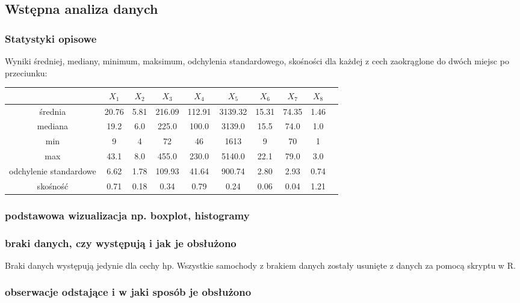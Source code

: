 \documentclass{article}
\begin{document}
    \subsection{Wstępna analiza danych}
        \subsubsection*{Statystyki opisowe}
        Wyniki średniej, mediany, minimum, maksimum, odchylenia standardowego, skośności dla każdej z cech zaokrąglone do dwóch 
        miejsc po przeciunku:
        \begin{center}
            \begin{tabular}{ |c|c|c|c|c|c|c|c|c|c| } 
                \hline
                & ${X_1}$ & ${X_2}$ & ${X_3}$ & ${X_4}$ & ${X_5}$ & ${X_6}$ & ${X_7}$ & ${X_8}$ \\
                \hline
                średnia & 20.76  & 5.81 & 216.09 & 112.91 & 3139.32 & 15.31 & 74.35 & 1.46 \\
                \hline
                mediana & 19.2 & 6.0 & 225.0 & 100.0 & 3139.0 & 15.5 & 74.0 & 1.0 \\
                \hline
                min & 9 & 4 & 72 & 46 & 1613 & 9 & 70 & 1  \\
                \hline
                max & 43.1 & 8.0 & 455.0 & 230.0 & 5140.0 & 22.1 & 79.0 &  3.0  \\
                \hline
                odchylenie standardowe & 6.62 & 1.78 & 109.93 & 41.64 & 900.74 & 2.80 & 2.93 &  0.74  \\
                \hline
                skośność & 0.71 & 0.18 & 0.34 & 0.79 & 0.24 & 0.06 & 0.04 &  1.21 \\
            \hline
            \end{tabular}
        \end{center}
        \subsubsection*{podstawowa wizualizacja np. boxplot, histogramy}
        \subsubsection*{braki danych, czy występują i jak je obsłużono}
        Braki danych występują jedynie dla cechy hp. Wszystkie samochody z brakiem danych zostały usunięte z danych za pomocą skryptu w R.
        \subsubsection*{obserwacje odstające i w jaki sposób je obsłużono}
\end{document}
